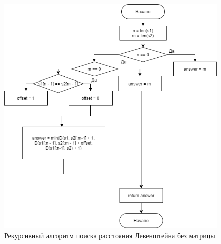 \documentclass{article}
\begin{document}
	 	\begin{figure}
		 	\includegraphics[scale=0.9]{LevenshtainRecursiveMatrixless}
		 	\caption{Рекурсивный алгоритм поиска расстояния Левенштейна без матрицы}
		 	\label{LevenshtainRecursiveMatrixless}
	 	\end{figure}
\end{document}
